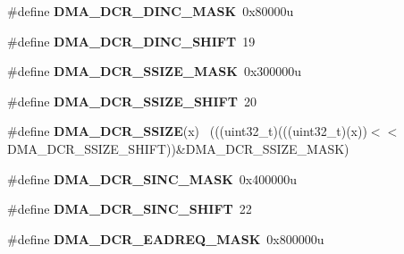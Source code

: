\begin{DoxyCompactItemize}
\item 
\hypertarget{group___d_m_a___register___masks_gad93bc8cb86ddeb7a40d9cd80011f8ee7}{}\#define {\bfseries D\+M\+A\+\_\+\+D\+C\+R\+\_\+\+D\+I\+N\+C\+\_\+\+M\+A\+S\+K}~0x80000u\label{group___d_m_a___register___masks_gad93bc8cb86ddeb7a40d9cd80011f8ee7}

\item 
\hypertarget{group___d_m_a___register___masks_ga9a4a7d49cd76a2821e2cf192d3a49fcd}{}\#define {\bfseries D\+M\+A\+\_\+\+D\+C\+R\+\_\+\+D\+I\+N\+C\+\_\+\+S\+H\+I\+F\+T}~19\label{group___d_m_a___register___masks_ga9a4a7d49cd76a2821e2cf192d3a49fcd}

\item 
\hypertarget{group___d_m_a___register___masks_ga5be9c16cc5eddfdd04e7820f698cd401}{}\#define {\bfseries D\+M\+A\+\_\+\+D\+C\+R\+\_\+\+S\+S\+I\+Z\+E\+\_\+\+M\+A\+S\+K}~0x300000u\label{group___d_m_a___register___masks_ga5be9c16cc5eddfdd04e7820f698cd401}

\item 
\hypertarget{group___d_m_a___register___masks_ga4229a9ea2db9960308edf51034836083}{}\#define {\bfseries D\+M\+A\+\_\+\+D\+C\+R\+\_\+\+S\+S\+I\+Z\+E\+\_\+\+S\+H\+I\+F\+T}~20\label{group___d_m_a___register___masks_ga4229a9ea2db9960308edf51034836083}

\item 
\hypertarget{group___d_m_a___register___masks_ga0a8797730201cca8a03aae52d0bc40de}{}\#define {\bfseries D\+M\+A\+\_\+\+D\+C\+R\+\_\+\+S\+S\+I\+Z\+E}(x)                                              ~(((uint32\+\_\+t)(((uint32\+\_\+t)(x))$<$$<$D\+M\+A\+\_\+\+D\+C\+R\+\_\+\+S\+S\+I\+Z\+E\+\_\+\+S\+H\+I\+F\+T))\&D\+M\+A\+\_\+\+D\+C\+R\+\_\+\+S\+S\+I\+Z\+E\+\_\+\+M\+A\+S\+K)\label{group___d_m_a___register___masks_ga0a8797730201cca8a03aae52d0bc40de}

\item 
\hypertarget{group___d_m_a___register___masks_ga5fff4a843815ef45cffdc31104379644}{}\#define {\bfseries D\+M\+A\+\_\+\+D\+C\+R\+\_\+\+S\+I\+N\+C\+\_\+\+M\+A\+S\+K}~0x400000u\label{group___d_m_a___register___masks_ga5fff4a843815ef45cffdc31104379644}

\item 
\hypertarget{group___d_m_a___register___masks_gad73f08f2770d56b3d6fd8bf6b9ff1cb9}{}\#define {\bfseries D\+M\+A\+\_\+\+D\+C\+R\+\_\+\+S\+I\+N\+C\+\_\+\+S\+H\+I\+F\+T}~22\label{group___d_m_a___register___masks_gad73f08f2770d56b3d6fd8bf6b9ff1cb9}

\item 
\hypertarget{group___d_m_a___register___masks_ga69c12559da76c7de9d21298f3a8815f4}{}\#define {\bfseries D\+M\+A\+\_\+\+D\+C\+R\+\_\+\+E\+A\+D\+R\+E\+Q\+\_\+\+M\+A\+S\+K}~0x800000u\label{group___d_m_a___register___masks_ga69c12559da76c7de9d21298f3a8815f4}


\end{DoxyCompactItemize}
